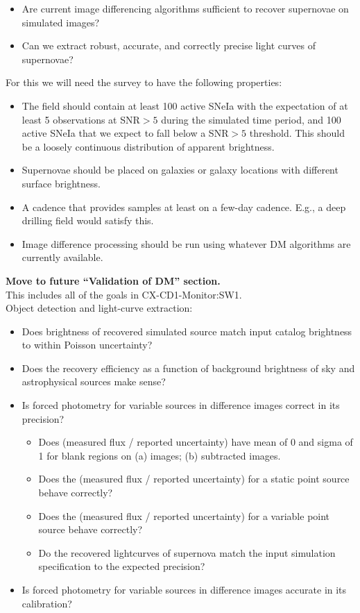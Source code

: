 \begin{itemize}
\item Are current image differencing algorithms sufficient to recover supernovae on simulated images?
\item Can we extract robust, accurate, and correctly precise light curves of supernovae?
\end{itemize}

For this we will need the \TwinklesOne survey to have the following
properties:
\begin{itemize}
\item The field should contain at least 100 active SNeIa with the expectation of at least 5 observations at SNR$>5$ during the simulated time period, and 100 active SNeIa that we expect to fall below a SNR$>5$ threshold.  This should be a loosely continuous distribution of apparent brightness.
\item Supernovae should be placed on galaxies or galaxy locations with different surface brightness.
\item A cadence that provides samples at least on a few-day cadence.  E.g., a deep drilling field would satisfy this.
\item Image difference processing should be run using whatever DM algorithms are currently available.
\end{itemize}

{\bf Move to future ``Validation of DM'' section.} \\
This includes all of the goals in CX-CD1-Monitor:SW1. \\
Object detection and light-curve extraction:
\begin{itemize}
\item Does brightness of recovered simulated source match input catalog brightness to within Poisson uncertainty?
\item Does the recovery efficiency as a function of background brightness of sky and astrophysical sources make sense?
\item Is forced photometry for variable sources in difference images correct in its precision?
    \begin{itemize}
    \item Does (measured flux / reported uncertainty) have mean of 0 and sigma of 1 for blank regions on (a) images; (b) subtracted images.
    \item Does the (measured flux / reported uncertainty) for a static point source behave correctly?
    \item Does the (measured flux / reported uncertainty) for a variable point source behave correctly?
    \item Do the recovered lightcurves of supernova match the input simulation specification to the expected precision?
    \end{itemize}
\item Is forced photometry for variable sources in difference images accurate in its calibration?
\end{itemize}



